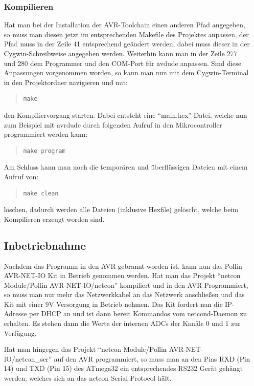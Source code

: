\documentclass[a4paper,14pt,headsepline]{scrartcl}
\begin{document}
\subsubsection{Kompilieren}
Hat man bei der Installation der AVR-Toolchain einen anderen Pfad angegeben, so muss man diesen jetzt im entsprechenden Makefile des Projektes anpassen, der Pfad muss in der Zeile 41 entsprechend geändert werden, dabei muss dieser in der Cygwin-Schreibweise angegeben werden. Weiterhin kann man in der Zeile 277 und 280 dem Programmer und den COM-Port für avdude anpassen. Sind diese Anpassungen vorgenommen worden, so kann man nun mit dem Cygwin-Terminal in den Projektordner navigieren und mit:
\begin{quote}
\begin{verbatim}
make
\end{verbatim}
\end{quote}
den Kompiliervorgang starten. Dabei entsteht eine "`main.hex"' Datei, welche nun zum Beispiel mit avrdude durch folgenden Aufruf in den Mikrocontroller programmiert werden kann:
\begin{quote}
\begin{verbatim}
make program
\end{verbatim}
\end{quote}
Am Schluss kann man noch die temporären und überflüssigen Dateien mit einem Aufruf von:
\begin{quote}
\begin{verbatim}
make clean
\end{verbatim}
\end{quote}
löschen, dadurch werden alle Dateien (inklusive Hexfile) gelöscht, welche beim Kompilieren erzeugt worden sind.

\subsection{Inbetriebnahme}
Nachdem das Programm in den AVR gebrannt worden ist, kann nun das Pollin-AVR-NET-IO Kit in Betrieb genommen werden. Hat man das Projekt "`netcon Module/Pollin AVR-NET-IO/netcon"' kompiliert und in den AVR Programmiert, so muss man nur mehr das Netzwerkkabel an das Netzwerk anschließen und das Kit mit einer 9V Versorgung in Betrieb nehmen. Das Kit fordert nun die IP-Adresse per DHCP an und ist dann bereit Kommandos vom netcond-Daemon zu erhalten. Es stehen dann die Werte der internen ADCs der Kanäle 0 und 1 zur  Verfügung.

Hat man hingegen das Projekt "`netcon Module/Pollin AVR-NET-IO/netcon\_ser"' auf den AVR programmiert, so muss man an den Pins RXD (Pin 14) und TXD (Pin 15) des ATmega32 ein entsprechendes RS232 Gerät gehängt werden, welches sich an das netcon Serial Protocol hält.
\end{document}
